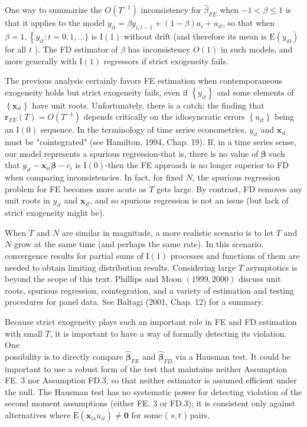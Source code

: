 \documentclass[10pt]{article}
\begin{document}
One way to summarize the $O\left(T^{-1}\right)$ inconsistency for $\hat{\beta}_{F E}$ when $-1<\beta \leq 1$ is that it applies to the model $y_{i t}=\beta y_{i, t-1}+(1-\beta) a_{i}+u_{i t}$, so that when $\beta=1,\left\{y_{i t}: t=\right. 0,1, \ldots\}$ is $\mathrm{I}(1)$ without drift (and therefore its mean is $\mathrm{E}\left(y_{i 0}\right)$ for all $t$ ). The FD estimator of $\beta$ has inconsistency $O(1)$ in such models, and more generally with $\mathrm{I}(1)$ regressors if strict exogeneity fails.

The previous analysis certainly favors FE estimation when contemporaneous exogeneity holds but strict exogeneity fails, even if $\left\{y_{i t}\right\}$ and some elements of $\left\{\mathbf{x}_{i t}\right\}$ have unit roots. Unfortunately, there is a catch: the finding that $\mathbf{r}_{F E}(T)=O\left(T^{-1}\right)$ depends critically on the idiosyncratic errors $\left\{u_{i t}\right\}$ being an $\mathrm{I}(0)$ sequence. In the terminology of time series econometrics, $y_{i t}$ and $\mathbf{x}_{i t}$ must be "cointegrated" (see Hamilton, 1994, Chap. 19). If, in a time series sense, our model represents a spurious regression-that is, there is no value of $\boldsymbol{\beta}$ such that $y_{i t}-\mathbf{x}_{i t} \boldsymbol{\beta}-c_{i}$ is $\mathrm{I}(0)$-then the FE approach is no longer superior to FD when comparing inconsistencies. In fact, for fixed $N$, the spurious regression problem for FE becomes more acute as $T$ gets large. By contrast, FD removes any unit roots in $y_{i t}$ and $\mathbf{x}_{i t}$, and so spurious regression is not an issue (but lack of strict exogeneity might be).

When $T$ and $N$ are similar in magnitude, a more realistic scenario is to let $T$ and $N$ grow at the same time (and perhaps the same rate). In this scenario, convergence results for partial sums of $\mathrm{I}(1)$ processes and functions of them are needed to obtain limiting distribution results. Considering large $T$ asymptotics is beyond the scope of this text. Phillips and Moon $(1999,2000)$ discuss unit roots, spurious regression, cointegration, and a variety of estimation and testing procedures for panel data. See Baltagi (2001, Chap. 12) for a summary.

Because strict exogeneity plays such an important role in FE and FD estimation with small $T$, it is important to have a way of formally detecting its violation. One\\
possibility is to directly compare $\hat{\boldsymbol{\beta}}_{F E}$ and $\hat{\boldsymbol{\beta}}_{F D}$ via a Hausman test. It could be important to use a robust form of the test that maintains neither Assumption FE. 3 nor Assumption FD.3, so that neither estimator is assumed efficient under the null. The Hausman test has no systematic power for detecting violation of the second moment assumptions (either FE. 3 or FD.3); it is consistent only against alternatives where $\mathrm{E}\left(\mathbf{x}_{i s}^{\prime} u_{i t}\right) \neq \mathbf{0}$ for some ( $s, t$ ) pairs.
\end{document}
